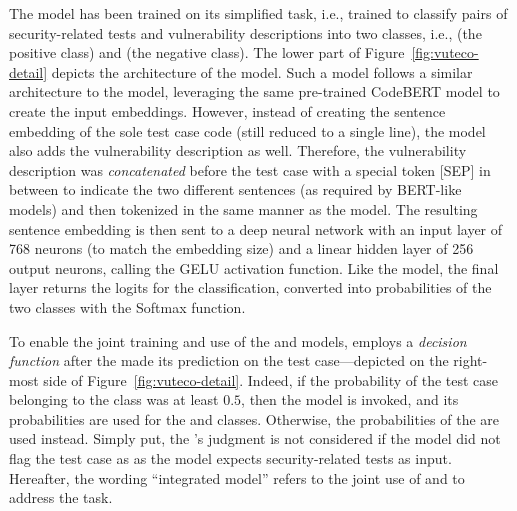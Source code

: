 The \linker model has been trained on its simplified task, i.e., trained to classify pairs of security-related tests and vulnerability descriptions into two classes, i.e., \linkerPosClass (the positive class) and \linkerNegClass (the negative class).
%
The lower part of Figure~\ref{fig:vuteco-detail} depicts the architecture of the \linker model.
Such a model follows a similar architecture to the \finder model, leveraging the same pre-trained CodeBERT model to create the input embeddings.
However, instead of creating the sentence embedding of the sole test case code (still reduced to a single line), the \linker model also adds the vulnerability description as well.
Therefore, the vulnerability description was \textit{concatenated} before the test case with a special token [SEP] in between to indicate the two different sentences (as required by BERT-like models) and then tokenized in the same manner as the \finder model.
%
The resulting sentence embedding is then sent to a deep neural network with an input layer of 768 neurons (to match the embedding size) and a linear hidden layer of 256 output neurons, calling the GELU activation function.
%
Like the \finder model, the final layer returns the logits for the classification, converted into probabilities of the two classes with the Softmax function.

To enable the joint training and use of the \finder and \linker models, \vuteco employs a \textit{decision function} after the \finder made its prediction on the test case---depicted on the right-most side of Figure~\ref{fig:vuteco-detail}.
Indeed, if the probability of the test case belonging to the \finderPosClass class was at least $0.5$, then the \linker model is invoked, and its probabilities are used for the \globalPosClass and \globalNegClass classes.
Otherwise, the probabilities of the \finder are used instead.
Simply put, the \linker's judgment is not considered if the \finder model did not flag the test case as \finderPosClass as the \linker model expects security-related tests as input.
%
Hereafter, the wording ``integrated model'' refers to the joint use of \finder and \linker to address the \matching task.


